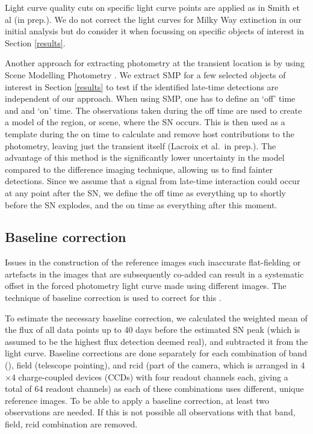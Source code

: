\documentclass[a4paper,oneside,12pt, class=Latex/Classes/PhDthesisPSnPDF, crop=false]{standalone}
\begin{document}
 Light curve quality cuts on specific light curve points are applied as in Smith et al (in prep.). We do not correct the light curves for Milky Way extinction in our initial analysis but do consider it when focussing on specific objects of interest in Section \ref{results}. 

Another approach for extracting photometry at the transient location is by using Scene Modelling Photometry \citep[SMP;][]{Holtzmann_SMP}. We extract SMP for a few selected objects of interest in Section \ref{results} to test if the identified late-time detections are independent of our approach. When using SMP, one has to define an `off' time and and `on' time. The observations taken during the off time are used to create a model of the region, or scene, where the SN occurs. This is then used as a template during the on time to calculate and remove host contributions to the photometry, leaving just the transient itself (Lacroix et al.~in prep.). The advantage of this method is the significantly lower uncertainty in the model compared to the difference imaging technique, allowing us to find fainter detections. Since we assume that a signal from late-time interaction could occur at any point after the SN, we define the off time as everything up to shortly before the SN explodes, and the on time as everything after this moment.


\subsection{Baseline correction}
 Issues in the construction of the reference images such inaccurate flat-fielding or artefacts in the images that are subsequently co-added can result in a systematic offset in the forced photometry light curve made using different images. The technique of baseline correction is used to correct for this \citep{Yao_baseline_corr,Miller_baseline_corr}. 

To estimate the necessary baseline correction, we calculated the weighted mean of the flux of all data points up to 40 days before the estimated SN peak (which is assumed to be the highest flux detection deemed real), and subtracted it from the light curve. Baseline corrections are done separately for each combination of band (\ztfg\ztfr\ztfi), field (telescope pointing), and rcid (part of the camera, which is arranged in 4$\times$4 charge-coupled devices (CCDs) with four readout channels each, giving a total of 64 readout channels) as each of these combinations uses different, unique reference images. To be able to apply a baseline correction, at least two observations are needed. If this is not possible all observations with that band, field, rcid combination are removed.
\end{document}
